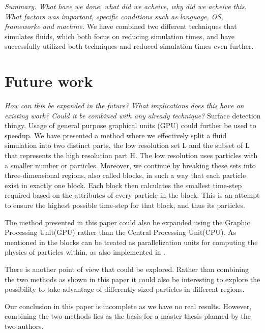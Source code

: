 \documentclass[../../main.tex]{subfiles}
\begin{document}
\textit{Summary. What have we done, what did we acheive, why did we acheive this. What factors was important, specific conditions such as language, OS, frameworke and machine.}
We have combined two different techniques that simulates fluids, which both focus on reducing simulation times, and have successfully utilized both techniques and reduced simulation times even further.


\section{Future work}
\textit{How can this be expanded in the future? What implications does this have on existing work? Could it be combined with any already technique?}
Surface detection thingy. 
Usage of general purpose graphical units (GPU) could further be used to speedup. 
We have presented a method where we effectively split a fluid simulation into two distinct parts, the low resolution set L and the subset of L that represents the high resolution part H. The low resolution uses particles with a smaller number or particles.
Moreover, we continue by breaking these sets into three-dimensional regions, also called blocks, in such a way that each particle exist in exactly one block. Each block then calculates the smallest time-step required based on the attributes of every particle in the block. This is an attempt to ensure the highest possible time-step for that block, and thus its particles. 

The method presented in this paper could also be expanded using the Graphic Processing Unit(GPU) rather than the Central Processing Unit(CPU). As mentioned in \cite{goswami2014regional} the blocks can be treated as parallelization units for computing the physics of particles within, as also implemented in \cite{goswami2010interactive}.

There is another point of view that could be explored. Rather than combining the two methods as shown in this paper it could also be interesting to explore the possibility to take advantage of differently sized particles in different regions.

Our conclusion in this paper is incomplete as we have no real results. However, combining the two methods lies as the basis for a master thesis planned by the two authors.
\end{document}
